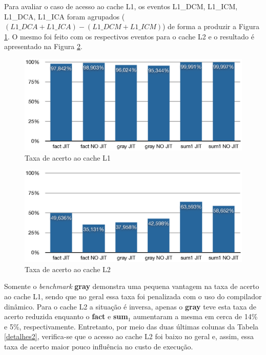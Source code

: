 Para avaliar o caso de acesso ao cache L1, os eventos L1\_DCM,
L1\_ICM, L1\_DCA, L1\_ICA foram agrupados ($(L1\_DCA + L1\_ICA) -
(L1\_DCM + L1\_ICM)$) de forma a produzir a Figura
\ref{fig:cachel1}. O mesmo foi feito com os respectivos eventos para o
cache L2 e o resultado é apresentado na Figura \ref{fig:cachel2}.

\begin{figure}[ht!]
  \centering
  \includegraphics[scale=0.70]{figs/cachel1}
  \caption{Taxa de acerto ao cache L1 \label{fig:cachel1}}
\end{figure}
\begin{figure}[ht!]
  \centering
  \includegraphics[scale=0.70]{figs/cachel2}
  \caption{Taxa de acerto ao cache L2 \label{fig:cachel2}}
\end{figure}

Somente o \textit{benchmark} \textbf{gray} demonstra uma pequena
vantagem na taxa de acerto ao cache L1, sendo que no geral essa taxa
foi penalizada com o uso do compilador dinâmico. Para o cache L2 a
situação é inversa, apenas o \textbf{gray} teve esta taxa de acerto
reduzida enquanto o \textbf{fact} e \textbf{sum$_1$} aumentaram a
mesma em cerca de 14\% e 5\%, respectivamente. Entretanto, por meio
das duas últimas colunas da Tabela \ref{detalhes2}, verifica-se que o
acesso ao cache L2 foi baixo no geral e, assim, essa taxa de acerto
maior pouco influência no custo de execução.

